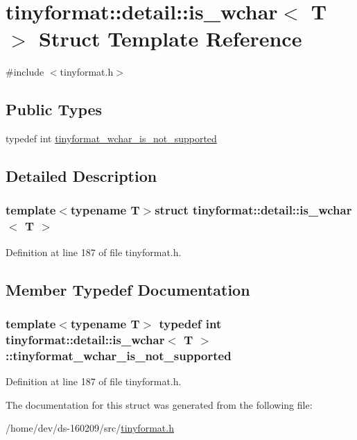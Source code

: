 \hypertarget{structtinyformat_1_1detail_1_1is__wchar}{}\section{tinyformat\+:\+:detail\+:\+:is\+\_\+wchar$<$ T $>$ Struct Template Reference}
\label{structtinyformat_1_1detail_1_1is__wchar}


{\ttfamily \#include $<$tinyformat.\+h$>$}

\subsection*{Public Types}
\begin{DoxyCompactItemize}
\item 
typedef int \hyperlink{structtinyformat_1_1detail_1_1is__wchar_a2006c700bf3264d6002993949bbaaac9}{tinyformat\+\_\+wchar\+\_\+is\+\_\+not\+\_\+supported}
\end{DoxyCompactItemize}


\subsection{Detailed Description}
\subsubsection*{template$<$typename T$>$struct tinyformat\+::detail\+::is\+\_\+wchar$<$ T $>$}



Definition at line 187 of file tinyformat.\+h.



\subsection{Member Typedef Documentation}
\hypertarget{structtinyformat_1_1detail_1_1is__wchar_a2006c700bf3264d6002993949bbaaac9}{}
\subsubsection[{tinyformat\+\_\+wchar\+\_\+is\+\_\+not\+\_\+supported}]{\setlength{\rightskip}{0pt plus 5cm}template$<$typename T$>$ typedef int {\bf tinyformat\+::detail\+::is\+\_\+wchar}$<$ T $>$\+::{\bf tinyformat\+\_\+wchar\+\_\+is\+\_\+not\+\_\+supported}}\label{structtinyformat_1_1detail_1_1is__wchar_a2006c700bf3264d6002993949bbaaac9}


Definition at line 187 of file tinyformat.\+h.



The documentation for this struct was generated from the following file\+:\begin{DoxyCompactItemize}
\item 
/home/dev/ds-\/160209/src/\hyperlink{tinyformat_8h}{tinyformat.\+h}\end{DoxyCompactItemize}
